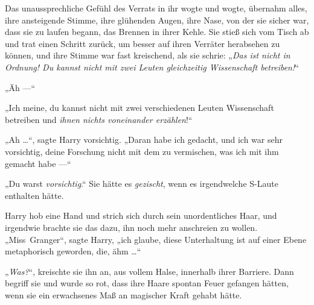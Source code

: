Das unaussprechliche Gefühl des Verrats in ihr wogte und wogte, übernahm alles, ihre ansteigende Stimme, ihre glühenden Augen, ihre Nase, von der sie sicher war, dass sie zu laufen begann, das Brennen in ihrer Kehle. Sie stieß sich vom Tisch ab und trat einen Schritt zurück, um besser auf ihren Verräter herabsehen zu können, und ihre Stimme war fast kreischend, als sie schrie:
„\emph{Das ist nicht in Ordnung! Du kannst nicht mit zwei Leuten gleichzeitig Wissenschaft betreiben!}“

„Äh —“

„Ich meine, du kannst nicht mit zwei verschiedenen Leuten Wissenschaft betreiben und \emph{ihnen nichts voneinander erzählen}!“

„Ah …“, sagte Harry vorsichtig.
„Daran habe ich gedacht, und ich war sehr vorsichtig, deine Forschung nicht mit dem zu vermischen, was ich mit ihm gemacht habe —“

„Du warst \emph{vorsichtig}.“
Sie hätte es \emph{gezischt}, wenn es irgendwelche S-Laute enthalten hätte.

Harry hob eine Hand und strich sich durch sein unordentliches Haar, und irgendwie brachte sie das dazu, ihn noch mehr anschreien zu wollen.
„Miss~Granger“, sagte Harry, „ich glaube, diese Unterhaltung ist auf einer Ebene metaphorisch geworden, die, ähm …“

„\emph{Was?}“, kreischte sie ihn an, aus vollem Halse, innerhalb ihrer Barriere. Dann begriff sie und wurde so rot, dass ihre Haare spontan Feuer gefangen hätten, wenn sie ein erwachsenes Maß an magischer Kraft gehabt hätte.

